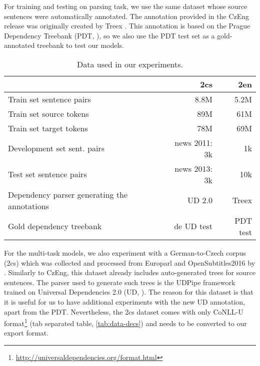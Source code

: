 For training and testing on parsing task, we use the same dataset whose source sentences were automatically annotated.
The annotation provided in the CzEng release was originally created by Treex \citep{tectomt:popel:2010}.
This annotation is based on the Prague Dependency Treebank (PDT, \cite{pdt20:2006}), so we also use the PDT test set as a gold-annotated treebank to test our models.

\begin{table}[t]
\small
\begin{center}
\begin{tabular}{lrr}
	& \textbf{\de2cs} & \textbf{\cs2en} \\
\hline
Train set sentence pairs     		& 8.8M      	& 5.2M \\
Train set source tokens		        & 89M  		    & 61M \\
Train set target tokens		        & 78M  		    & 69M \\
Development set sent. pairs         & news 2011: 3k & 1k \\
Test set sentence pairs          	& news 2013: 3k & 10k \\
Dependency parser generating the annotations				  	& UD 2.0 & Treex \\
Gold dependency treebank     & de UD test & PDT test  \\
\end{tabular}
\end{center}
\caption{Data used in our experiments.}
\label{tab:data}
\end{table}

For the multi-task models, we also experiment with a German-to-Czech corpus (\de2cs) which was collected and processed from Europarl \citep{europarl} and OpenSubtitles2016 \citep{OPUS} by \cite{machacek2018de2cs}.
Similarly to CzEng, this dataset already includes auto-generated trees for source sentences.
The parser used to generate such trees is the UDPipe framework \citep{udpipe} trained on Universal Dependencies 2.0 (UD, \cite{UD20}).
The reason for this dataset is that it is useful for us to have additional experiments with the new UD annotation, apart from the PDT. Nevertheless, the \de2cs dataset comes with only CoNLL-U format\footnote{\url{http://universaldependencies.org/format.html}} (tab separated table, \cref{tab:data-decs}) and needs to be converted to our export format.

